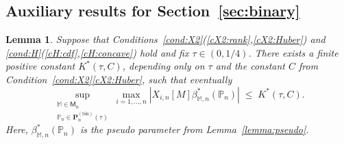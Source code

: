 \documentclass[preprint]{imsart}
\renewcommand{\P}{{\mathbb P}}
\newcommand{\M}{\mathbb M}
\newtheorem{lemma}[theorem]{Lemma}
\numberwithin{equation}{section}
\begin{document}

\subsection{Auxiliary results for Section~\ref{sec:binary}}


\begin{lemma}\label{lemma:pseudoBound}
Suppose that Conditions~\ref{cond:X2}(\ref{cX2:rank},\ref{cX2:Huber}) and \ref{cond:H}(\ref{cH:cdf},\ref{cH:concave}) hold and fix $\tau\in(0,1/4)$. There exists a finite positive constant $K^*(\tau, C)$, depending only on $\tau$ and the constant $C$ from Condition~\ref{cond:X2}\eqref{cX2:Huber}, such that eventually 
$$
\sup_{\substack{\M\in\mathsf{M}_n\\\P_n\in\mathbf{P}_n^{(\mathrm{bin})}(\tau)}} \max_{i=1,\dots, n}|X_{i,n}[M]\beta_{\M,n}^*(\P_n)| \;\le\; K^*(\tau, C).
$$ 
Here, $\beta_{\M,n}^*(\P_n)$ is the pseudo parameter from Lemma~\ref{lemma:pseudo}.
\end{lemma}
\end{document}
